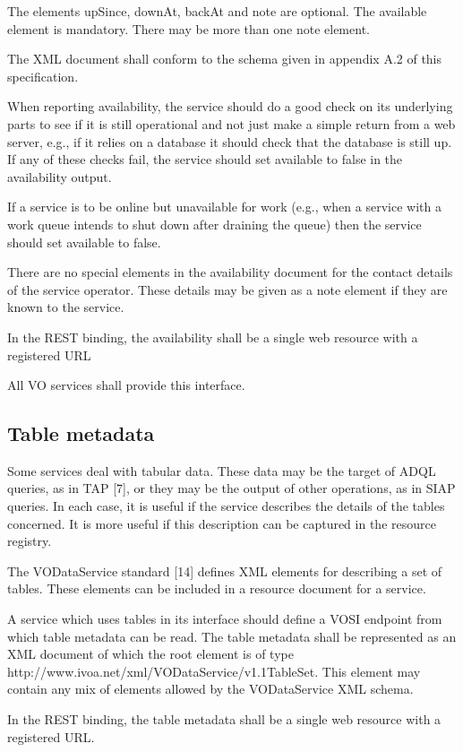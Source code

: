 \documentclass[11pt,letter]{ivoa}
\begin{document}
The elements upSince, downAt, backAt and note are optional. The available element is mandatory. There may be more than one note element.

The XML document shall conform to the schema given in appendix A.2 of this specification.

When reporting availability, the service should do a good check on its underlying parts to see if it is still operational and not just make a simple return from a web server, e.g., if it relies on a database it should check that the database is still up. If any of these checks fail, the service should set available to false in the availability output.

If a service is to be online but unavailable for work (e.g., when a service with a work queue intends to shut down after draining the queue) then the service should set available to false.

There are no special elements in the availability document for the contact details of the service operator. These details may be given as a note element if they are known to the service.

In the REST binding, the availability shall be a single web resource with a registered URL

All VO services shall provide this interface. 

\subsection{Table metadata}

 Some services deal with tabular data. These data may be the target of ADQL queries, as in TAP [7], or they may be the output of other operations, as in SIAP queries. In each case, it is useful if the service describes the details of the tables concerned. It is more useful if this description can be captured in the resource registry.

The VODataService standard [14] defines XML elements for describing a set of tables. These elements can be included in a resource document for a service.

A service which uses tables in its interface should define a VOSI endpoint from which table metadata can be read. The table metadata shall be represented as an XML document of which the root element is of type {http://www.ivoa.net/xml/VODataService/v1.1}TableSet. This element may contain any mix of elements allowed by the VODataService XML schema.

In the REST binding, the table metadata shall be a single web resource with a registered URL. 
\end{document}
